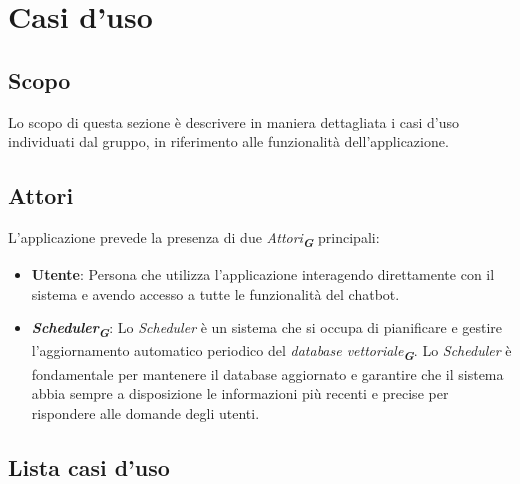 

\section{Casi d'uso}
\label{sec:casi_uso}

\subsection{Scopo}

Lo scopo di questa sezione è descrivere in maniera dettagliata i casi d’uso individuati dal
gruppo, in riferimento alle funzionalità dell’applicazione.


\subsection{Attori}
\label{sec:attori}

L’applicazione prevede la presenza di due \emph{Attori}\textsubscript{\textbf{\textit{G}}} principali:

\begin{itemize}
    \item \textbf{Utente}: Persona che utilizza l'applicazione interagendo direttamente con il sistema e avendo accesso a tutte le funzionalità del chatbot.
    \item \textbf{\emph{Scheduler}\textsubscript{\textbf{\textit{G}}}}: Lo \emph{Scheduler} è un sistema che si occupa di pianificare e gestire l'aggiornamento automatico periodico del \emph{database vettoriale}\textsubscript{\textbf{\textit{G}}}. Lo \emph{Scheduler} è fondamentale per mantenere il database aggiornato e garantire che il sistema abbia sempre a disposizione le informazioni più recenti e precise per rispondere alle domande degli utenti.

\end{itemize}


\subsection{Lista casi d'uso}





